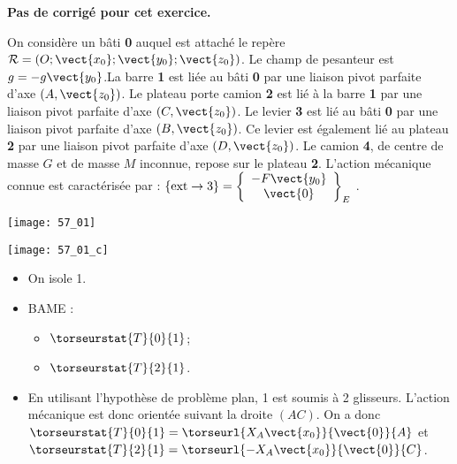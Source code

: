 \normalfalse \difficiletrue \tdifficilefalse
\correctiontrue


\setcounter{question}{0}
\ifcorrection
\else
\textbf{Pas de corrigé pour cet exercice.}
\fi

\ifprof
\else
On considère un bâti \textbf{0} auquel est attaché le repère$\mathcal{R}=\left(O;\vect{x_0};\vect{y_0};\vect{z_0} \right)$. Le champ de pesanteur est $g=-g\vect{y_0}$.La barre \textbf{1} est liée au bâti \textbf{0} par une liaison pivot parfaite d’axe $\left(A,\vect{z_0}\right)$. Le plateau porte camion \textbf{2} est lié à la barre \textbf{1} par une liaison pivot parfaite d’axe $\left(C,\vect{z_0}\right)$. Le levier \textbf{3} est lié au bâti \textbf{0} par une liaison pivot parfaite d’axe $\left(B,\vect{z_0}\right)$. Ce levier est également lié au plateau \textbf{2} par une liaison pivot parfaite d’axe $\left(D,\vect{z_0}\right)$. Le camion \textbf{4}, de centre de masse $G$ et de masse $M$ inconnue, repose sur le plateau \textbf{2}.
L’action mécanique connue est caractérisée par : $\{\text{ext}\rightarrow 3\}=\left\{
\begin{array}{c}
-F\vect{y_0} \\
\vect{0} \\
\end{array}
\right\}_E$ .


\begin{center}
\texttt{[image: 57\_01]}
\end{center}


\fi

\ifprof
\begin{center}
\texttt{[image: 57\_01\_c]}
\end{center}
\else
\fi



\ifprof
\begin{itemize}
\item On isole 1.
\item BAME :
\begin{itemize}
\item $\torseurstat{T}{0}{1}$;
\item $\torseurstat{T}{2}{1}$.
\end{itemize}
\item En utilisant l'hypothèse de problème plan, 1 est soumis à 2 glisseurs. L'action mécanique est donc orientée suivant la droite $(AC)$. 
On a donc 
$\torseurstat{T}{0}{1} = \torseurl{X_A\vect{x_0}}{\vect{0}}{A}$ et 
$\torseurstat{T}{2}{1} = \torseurl{-X_A\vect{x_0}}{\vect{0}}{C}$.

\end{itemize}
\else
\fi


